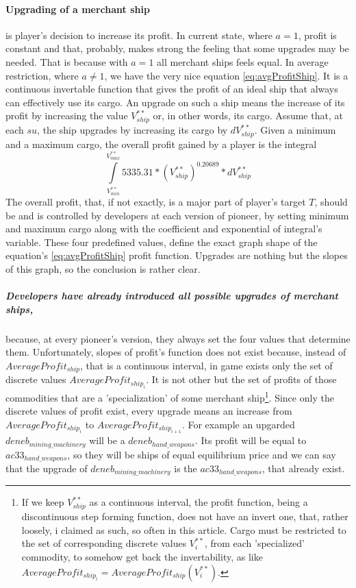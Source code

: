 \documentclass[]{article}
\begin{document}
\paragraph{Upgrading of a merchant ship} is player's decision to increase its profit. In current state, where $a=1$, profit is constant and that, probably, makes strong the feeling that some upgrades may be needed. That is because with $a=1$ all merchant ships feels equal. In average restriction, where $a\ne1$, we have the very nice equation \eqref{eq:avgProfitShip}. It is a continuous invertable function that gives the profit of an ideal ship that always can effectively use its cargo. An upgrade on such a ship means the increase of its profit by increasing the value $V^{**}_{ship}$ or, in other words, its cargo. Assume that, at each $su$, the ship upgrades by increasing its cargo by $dV^{**}_{ship}$.  Given a minimum and a maximum cargo, the overall profit gained by a player is the integral 
\[\overset{V^{**}_{max}}{\underset{V^{**}_{min}}{\int}}5335.31*(V^{**}_{ship})^{0.20689}*dV^{**}_{ship}\]  
 The overall profit, that, if not exactly, is a major part of player's target $T$, should be and is controlled by developers at each version of pioneer, by setting minimum and maximum cargo along with the coefficient and exponential of integral's variable. These four predefined values, define the exact graph shape of the equation's \eqref{eq:avgProfitShip} profit function. Upgrades are nothing but the slopes of this graph, so the conclusion is rather clear.
 \subparagraph{Developers have already introduced all possible upgrades of merchant ships,} because, at every pioneer's version, they always set the four values that determine them. Unfortunately, slopes of profit's function does not exist because, instead of $AverageProfit_{ship}$, that is a continuous interval, in game exists only the set of discrete values $AverageProfit_{ship_{i}}$. It is not other but the set of profits of those commodities that are a 'specialization' of some merchant ship\footnote{If we keep $V^{**}_{ship}$ as a continuous interval, the profit function, being a discontinuous step forming function, does not have an invert one, that, rather loosely, i claimed as such, so often in this article. Cargo must be restricted to the set of corresponding discrete values $V^{**}_{i}$, from each 'specialized' commodity, to somehow get back the invertability, as like $AverageProfit_{ship_{i}}=AverageProfit_{ship}(V^{**}_{i})$.}. Since only the discrete values of profit exist, every upgrade means an increase from $AverageProfit_{ship_{i}}$ to $AverageProfit_{ship_{i+1}}$. For example an upgarded $deneb_{mining\_machinery}$ will be a  $deneb_{hand\_weapons}$. Its profit will be equal to $ac33_{hand\_weapons}$, so they will be ships of equal equilibrium price and we can say that the upgrade of  $deneb_{mining\_machinery}$ is the $ac33_{hand\_weapons}$, that already exist.
\end{document}
